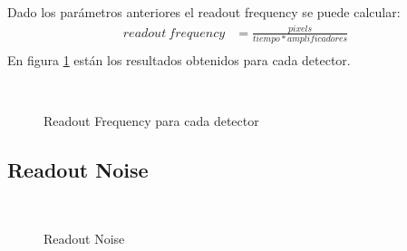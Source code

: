 \documentclass[a4paper,10pt]{article}
\begin{document}
Dado los parámetros anteriores el readout frequency se puede calcular: 
\begin{align*}
readout\ frequency &= \frac{pixels}{tiempo*amplificadores}\\
\end{align*}
En figura \ref{fig:p3} están los resultados obtenidos para cada detector.
\begin{figure}[ht!]
  \centering
  ~ 
  ~ 
  ~ 
  \caption{Readout Frequency para cada detector}
  \label{fig:p3}
\end{figure}

\subsection{Readout Noise}
\begin{figure}[ht!]
  \centering
  ~ 
  \caption{Readout Noise}
  \label{fig:p3_a}
\end{figure}
\end{document}
